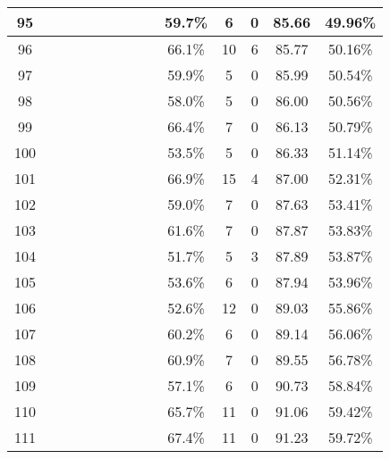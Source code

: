\begin{longtable}{|c|c|c|c|c|c|c|c|c|c|c|c|c|c|}
95 &  \x    & \x    & \x    &       &       &       &       & \x    & 59.7\% &  6  & 0  & 85.66 & 49.96\% \\ \hline
96 &  \x    & \x    & \x    &       & \x\m  &       & \x\m  &       & 66.1\% &  10 & 6  & 85.77 & 50.16\% \\ \hline
97 &  \x    & \x    & \x    &       &       & \x    & \x    &       & 59.9\% &  5  & 0  & 85.99 & 50.54\% \\ \hline
98 &  \x    & \x    &       &       & \x    & \x    &       &       & 58.0\% &  5  & 0  & 86.00 & 50.56\% \\ \hline
99 &  \x    & \x    & \x    &       & \x\m  &       &       & \x    & 66.4\% &  7  & 0  & 86.13 & 50.79\% \\ \hline
100 &  \x    & \x    &       & \x    &       & \x    &       &       & 53.5\% &  5  & 0  & 86.33 & 51.14\% \\ \hline
101 &  \x    & \x    &       &       & \x\m  &       &       & \x\m  & 66.9\% &  15 & 4  & 87.00 & 52.31\% \\ \hline
102 &  \x    & \x    & \x    &       &       & \x    &       & \x\m  & 59.0\% &  7  & 0  & 87.63 & 53.41\% \\ \hline
103 &  \x    & \x    & \x    & \x    &       & \x\m  & \x\m  &       & 61.6\% &  7  & 0  & 87.87 & 53.83\% \\ \hline
104 &  \x    & \x    &       &       &       & \x    &       &       & 51.7\% &  5  & 3  & 87.89 & 53.87\% \\ \hline
105 &  \x    & \x    &       & \x    &       &       &       &       & 53.6\% &  6  & 0  & 87.94 & 53.96\% \\ \hline
106 &  \x    & \x    &       &       &       &       &       &       & 52.6\% &  12 & 0  & 89.03 & 55.86\% \\ \hline
107 &  \x    & \x    & \x    &       &       & \x    & \x\m  &       & 60.2\% &  6  & 0  & 89.14 & 56.06\% \\ \hline
108 &  \x    & \x    & \x    & \x    &       &       &       & \x    & 60.9\% &  7  & 0  & 89.55 & 56.78\% \\ \hline
109 &  \x    & \x    &       &       & \x    & \x    & \x    &       & 57.1\% &  6  & 0  & 90.73 & 58.84\% \\ \hline
110 &  \x    & \x    &       & \x    & \x\m  &       &       &       & 65.7\% &  11 & 0  & 91.06 & 59.42\% \\ \hline
111 &  \x    & \x    &       &       & \x\m  &       &       &       & 67.4\% &  11 & 0  & 91.23 & 59.72\% \\ \hline

\end{longtable}
